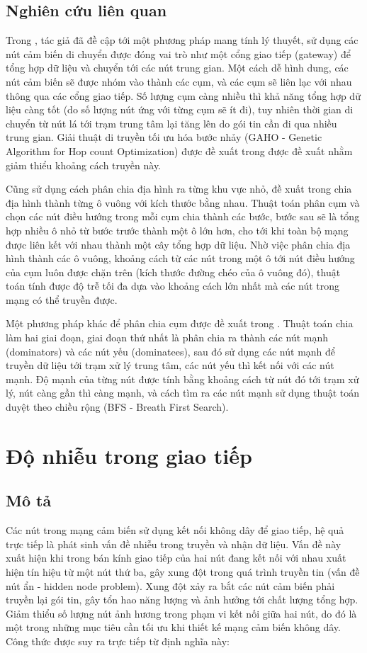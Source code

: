 \subsection{Nghiên cứu liên quan}
Trong \cite{youssef2007intelligent}, tác giả đã đề cập tới một phương pháp mang tính lý thuyết, sử dụng các nút cảm biến di chuyển được đóng vai trò như một cổng giao tiếp (gateway) để tổng hợp dữ liệu và chuyển tới các nút trung gian. Một cách dễ hình dung, các nút cảm biến sẽ được nhóm vào thành các cụm, và các cụm sẽ liên lạc với nhau thông qua các cổng giao tiếp. Số lượng cụm càng nhiều thì khả năng tổng hợp dữ liệu càng tốt (do số lượng nút ứng với từng cụm sẽ ít đi), tuy nhiên thời gian di chuyển từ nút lá tới trạm trung tâm lại tăng lên do gói tin cần đi qua nhiều trung gian. Giải thuật di truyền tối ưu hóa bước nhảy (GAHO - Genetic Algorithm for Hop count Optimization) được đề xuất trong \cite{youssef2007intelligent} được đề xuất nhằm giảm thiểu khoảng cách truyền này.


Cũng sử dụng cách phân chia địa hình ra từng khu vực nhỏ, đề xuất trong \cite{wang2012minimizing} chia địa hình thành từng ô vuông với kích thước bằng nhau. Thuật toán phân cụm và chọn các nút điều hướng trong mỗi cụm chia thành các bước, bước sau sẽ là tổng hợp nhiều ô nhỏ từ bước trước thành một ô lớn hơn, cho tới khi toàn bộ mạng được liên kết với nhau thành một cây tổng hợp dữ liệu. Nhờ việc phân chia địa hình thành các ô vuông, khoảng cách từ các nút trong một ô tới nút điều hướng của cụm luôn được chặn trên (kích thước đường chéo của ô vuông đó), thuật toán tính được độ trễ tối đa dựa vào khoảng cách lớn nhất mà các nút trong mạng có thể truyền được.


Một phương pháp khác để phân chia cụm được đề xuất trong \cite{xu2010delay}. Thuật toán chia làm hai giai đoạn, giai đoạn thứ nhất là phân chia ra thành các nút mạnh (dominators) và các nút yếu (dominatees), sau đó sử dụng các nút mạnh để truyền dữ liệu tới trạm xử lý trung tâm, các nút yếu thì kết nối với các nút mạnh. Độ mạnh của từng nút được tính bằng khoảng cách từ nút đó tới trạm xử lý, nút càng gần thì càng mạnh, và cách tìm ra các nút mạnh sử dụng thuật toán duyệt theo chiều rộng (BFS - Breath First Search).

\section{Độ nhiễu trong giao tiếp}
\subsection{Mô tả}
Các nút trong mạng cảm biến sử dụng kết nối không dây để giao tiếp, hệ quả trực tiếp là phát sinh vấn đề nhiễu trong truyền và nhận dữ liệu. Vấn đề này xuất hiện khi trong bán kính giao tiếp của hai nút đang kết nối với nhau xuất hiện tín hiệu từ một nút thứ ba, gây xung đột trong quá trình truyền tin (vấn đề nút ẩn - hidden node problem). Xung đột xảy ra bắt các nút cảm biến phải truyền lại gói tin, gây tổn hao năng lượng và ảnh hưởng tới chất lượng tổng hợp. Giảm thiểu số lượng nút ảnh hương trong phạm vi kết nối giữa hai nút, do đó là một trong những mục tiêu cần tối ưu khi thiết kế mạng cảm biến không dây. Công thức được suy ra trực tiếp từ định nghĩa này:

